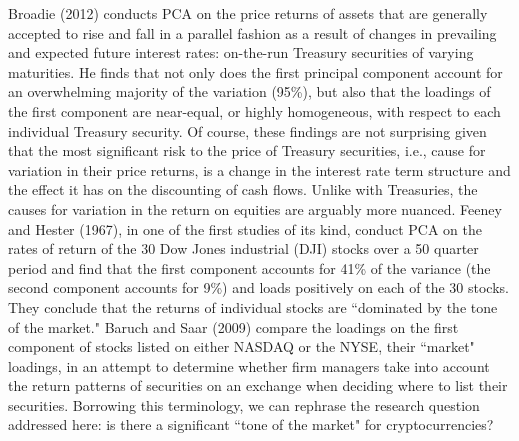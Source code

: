 \documentclass[12pt,twoside]{article}
\begin{document}
Broadie (2012) conducts PCA on the price returns of assets that are generally accepted to rise and fall in a parallel fashion as a result of changes in prevailing and expected future interest rates: on-the-run Treasury securities of varying maturities. He finds that not only does the first principal component account for an overwhelming majority of the variation (95\%), but also that the loadings of the first component are near-equal, or highly homogeneous, with respect to each individual Treasury security. Of course, these findings are not surprising given that the most significant risk to the price of Treasury securities, i.e., cause for variation in their price returns, is a change in the interest rate term structure and the effect it has on the discounting of cash flows. Unlike with Treasuries, the causes for variation in the return on equities are arguably more nuanced. Feeney and Hester (1967), in one of the first studies of its kind, conduct PCA on the rates of return of the 30 Dow Jones industrial (DJI) stocks over a 50 quarter period and find that the first component accounts for 41\% of the variance (the second component accounts for 9\%) and loads positively on each of the 30 stocks. They conclude that the returns of individual stocks are ``dominated by the tone of the market." Baruch and Saar (2009) compare the loadings on the first component of stocks listed on either NASDAQ or the NYSE, their ``market" loadings, in an attempt to determine whether firm managers take into account the return patterns of securities on an exchange when deciding where to list their securities. Borrowing this terminology, we can rephrase the research question addressed here: is there a significant ``tone of the market" for cryptocurrencies?
\end{document}
